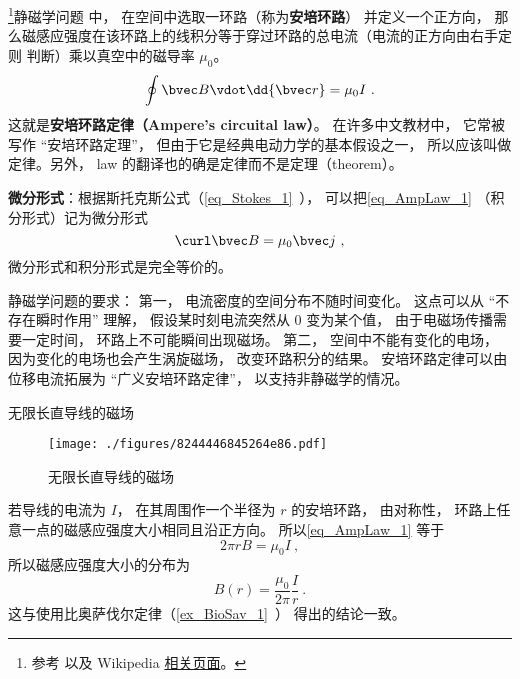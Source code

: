 

\footnote{参考 \cite{GriffE} 以及 Wikipedia \href{https://en.wikipedia.org/wiki/Amp\%C3\%A8re's_circuital_law}{相关页面}。}静磁学问题%
中， 在空间中选取一环路（称为\textbf{安培环路}） 并定义一个正方向， 那么磁感应强度在该环路上的线积分等于穿过环路的总电流（电流的正方向由右手定则 判断）乘以真空中的磁导率 $\mu_0$。
\begin{equation}\label{eq_AmpLaw_1}
\oint \bvec B \vdot \dd{\bvec r} = \mu_0 I~.
\end{equation}
这就是\textbf{安培环路定律（Ampere's circuital law）}。 在许多中文教材中， 它常被写作 “安培环路定理”， 但由于它是经典电动力学的基本假设之一， 所以应该叫做定律。另外， law 的翻译也的确是定律而不是定理（theorem）。

\textbf{微分形式}：根据斯托克斯公式（\autoref{eq_Stokes_1}~）， 可以把\autoref{eq_AmpLaw_1} （积分形式）记为微分形式
\begin{equation}\label{eq_AmpLaw_2}
\curl \bvec B = \mu_0 \bvec j~,
\end{equation}
微分形式和积分形式是完全等价的。

静磁学问题的要求： 第一， 电流密度的空间分布不随时间变化。 这点可以从 “不存在瞬时作用” 理解， 假设某时刻电流突然从 0 变为某个值， 由于电磁场传播需要一定时间， 环路上不可能瞬间出现磁场。 第二， 空间中不能有变化的电场， 因为变化的电场也会产生涡旋磁场， 改变环路积分的结果。 安培环路定律可以由位移电流拓展为 “广义安培环路定律”， 以支持非静磁学的情况。

\begin{example}{无限长直导线的磁场}\label{ex_AmpLaw_1}
\begin{figure}[ht]
\centering
\texttt{[image: ./figures/8244446845264e86.pdf]}
\caption{无限长直导线的磁场} \label{fig_AmpLaw_2}
\end{figure}
若导线的电流为 $I$， 在其周围作一个半径为 $r$ 的安培环路， 由对称性， 环路上任意一点的磁感应强度大小相同且沿正方向。 所以\autoref{eq_AmpLaw_1} 等于
\begin{equation}
2\pi r B = \mu_0 I~,
\end{equation}
所以磁感应强度大小的分布为
\begin{equation}
B(r) = \frac{\mu_0}{2\pi} \frac Ir~.
\end{equation}
这与使用比奥萨伐尔定律（\autoref{ex_BioSav_1}~） 得出的结论一致。
\end{example}

